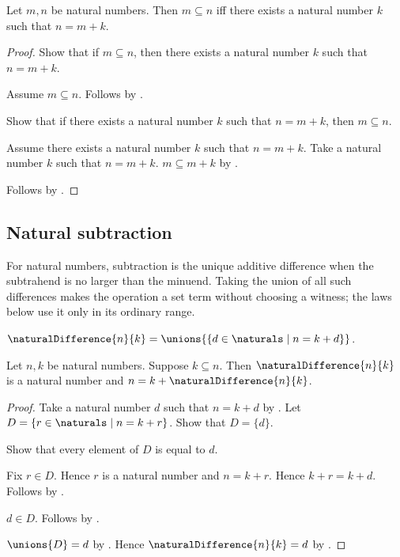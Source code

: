 \begin{theorem}\label{natural_subseteq_iff_additive_difference}
    Let $m,n$ be natural numbers.
    Then $m\subseteq n$ iff there exists a natural number $k$ such that
        $n=m+k$.
\end{theorem}
\begin{proof}
    Show that if $m\subseteq n$, then there exists a natural number $k$
        such that $n=m+k$.
    \begin{subproof}
        Assume $m\subseteq n$.
        Follows by .
    \end{subproof}
    Show that if there exists a natural number $k$ such that $n=m+k$,
        then $m\subseteq n$.
    \begin{subproof}
        Assume there exists a natural number $k$ such that $n=m+k$.
        Take a natural number $k$ such that $n=m+k$.
        $m\subseteq m+k$ by .
    \end{subproof}
    Follows by \auto.
\end{proof}

\subsection{Natural subtraction}

For natural numbers, subtraction is the unique additive difference when the
subtrahend is no larger than the minuend.  Taking the union of all such
differences makes the operation a set term without choosing a witness; the
laws below use it only in its ordinary range.

\begin{definition}\label{natural_difference}
    $\naturalDifference{n}{k}
        =\unions{\{d\in\naturals\mid n=k+d\}}$.
\end{definition}

\begin{theorem}\label{natural_difference_specification}
    Let $n,k$ be natural numbers.
    Suppose $k\subseteq n$.
    Then $\naturalDifference{n}{k}$ is a natural number and
        $n=k+\naturalDifference{n}{k}$.
\end{theorem}
\begin{proof}
    Take a natural number $d$ such that $n=k+d$ by
        .
    Let $D=\{r\in\naturals\mid n=k+r\}$.
    Show that $D=\{d\}$.
    \begin{subproof}
        Show that every element of $D$ is equal to $d$.
        \begin{subproof}
            Fix $r\in D$.
            Hence $r$ is a natural number and $n=k+r$.
            Hence $k+r=k+d$.
            Follows by .
        \end{subproof}
        $d\in D$.
        Follows by .
    \end{subproof}
    $\unions{D}=d$ by
        .
    Hence $\naturalDifference{n}{k}=d$ by
        .
\end{proof}

